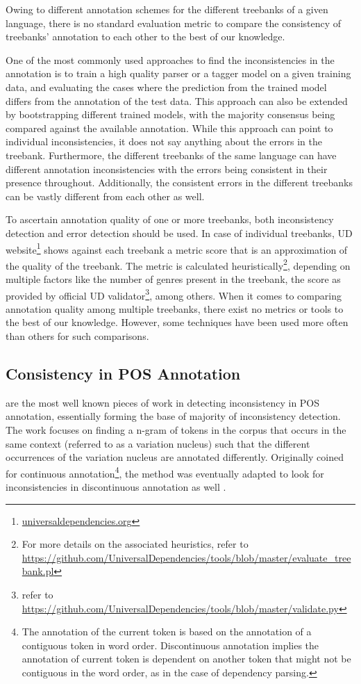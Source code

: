 Owing to different annotation schemes for the different treebanks of a given language, there is no standard evaluation metric to compare the consistency of treebanks' annotation to each other to the best of our knowledge. 

One of the most commonly used approaches to find the inconsistencies in the annotation is to train a high quality parser or a tagger model on a given training data, and evaluating the cases where the prediction from the trained model differs from the annotation of the test data. This approach can also be extended by bootstrapping different trained models, with the majority consensus being compared against the available annotation. While this approach can point to individual inconsistencies, it does not say anything about the errors in the treebank. Furthermore, the different treebanks of the same language can have different annotation inconsistencies with the errors being consistent in their presence throughout. Additionally, the consistent errors in the different treebanks can be vastly different from each other as well.

To ascertain annotation quality of one or more treebanks, both inconsistency detection and error detection should be used. In case of individual treebanks, UD website\footnote{\url{universaldependencies.org}} shows against each treebank a metric score that is an approximation of the quality of the treebank. The metric is calculated heuristically\footnote{For more details on the associated heuristics, refer to \url{https://github.com/UniversalDependencies/tools/blob/master/evaluate_treebank.pl}}, depending on multiple factors like the number of genres present in the treebank, the score as provided by official UD validator\footnote{refer to \url{https://github.com/UniversalDependencies/tools/blob/master/validate.py}}, among others. When it comes to comparing annotation quality among multiple treebanks, there exist no metrics or tools to the best of our knowledge. However, some techniques have been used more often than others for such comparisons.

\subsection{Consistency in POS Annotation}
\label{ssec:inconsistency-detection-pos}

\cite{dickinson03a, dickinson03b} are the most well known pieces of work in detecting inconsistency in POS annotation, essentially forming the base of majority of inconsistency detection. The work focuses on finding a n-gram of tokens in the corpus that occurs in the same context (referred to as a variation nucleus) such that the different occurrences of the variation nucleus are annotated differently. Originally coined for continuous annotation\footnote{The annotation of the current token is based on the annotation of a contiguous token in word order. Discontinuous annotation implies the annotation of current token is dependent on another token that might not be contiguous in the word order, as in the case of dependency parsing.}, the method was eventually adapted to look for inconsistencies in discontinuous annotation as well \citep{dickinson05}.


